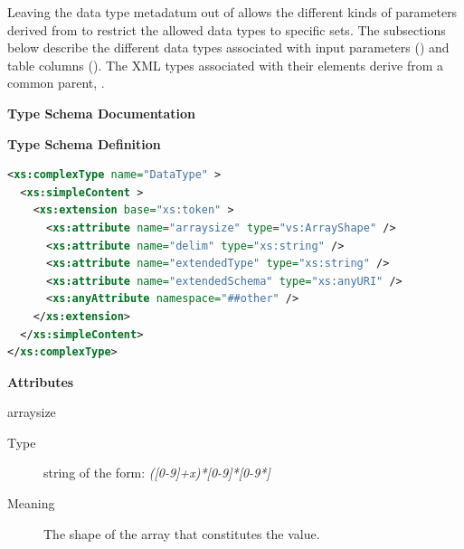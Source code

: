 \documentclass[11pt,a4paper]{ivoa}
\begin{document}

Leaving the data type metadatum out of 
allows the different kinds of parameters derived from
 to restrict the allowed data types to
specific sets.  The subsections below describe the different data
types associated with input parameters
() and table
columns ().  The
XML types associated with their  elements
derive from a common parent, .


\begin{generated}
\begingroup
      	\renewcommand*\descriptionlabel[1]{%
      	\hbox to 5.5em{\emph{#1}\hfil}}\vspace{2ex}\noindent\textbf{ Type Schema Documentation}



\vspace{1ex}\noindent\textbf{ Type Schema Definition}

\begin{lstlisting}[language=XML,basicstyle=\footnotesize]
<xs:complexType name="DataType" >
  <xs:simpleContent >
    <xs:extension base="xs:token" >
      <xs:attribute name="arraysize" type="vs:ArrayShape" />
      <xs:attribute name="delim" type="xs:string" />
      <xs:attribute name="extendedType" type="xs:string" />
      <xs:attribute name="extendedSchema" type="xs:anyURI" />
      <xs:anyAttribute namespace="##other" />
    </xs:extension>
  </xs:simpleContent>
</xs:complexType>
\end{lstlisting}

\vspace{0.5ex}\noindent\textbf{ Attributes}

\begingroup\small\begin{bigdescription}
\item[arraysize]
\begin{description}
\item[Type] string of the form: \emph{([0-9]+x)*[0-9]*[0-9*]}
\item[Meaning] 
                     The shape of the array that constitutes the value.
                  

\end{description}
\end{bigdescription}
\end{generated}
\end{document}

